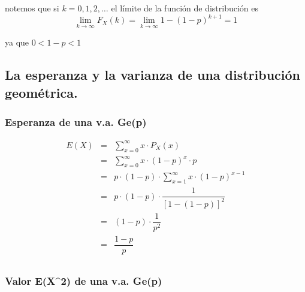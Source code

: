 \documentclass[
]{article}
\begin{document}
notemos que si \(k=0,1,2,\ldots\) el límite de la función de
distribución es
\[\lim_{k\to \infty} F_X(k) = \lim_{k\to \infty} 1 - (1-p)^{k+1} = 1\]

ya que \(0<1-p<1\)

\hypertarget{la-esperanza-y-la-varianza-de-una-distribuciuxf3n-geomuxe9trica.}{%
\subsection{La esperanza y la varianza de una distribución
geométrica.}\label{la-esperanza-y-la-varianza-de-una-distribuciuxf3n-geomuxe9trica.}}

\hypertarget{esperanza-de-una-v.a.-gep}{%
\subsubsection{Esperanza de una v.a.
Ge(p)}\label{esperanza-de-una-v.a.-gep}}

\[\begin{array}{rcl}
  E(X) &=& \sum\limits_{x=0}^\infty x \cdot P_X(x)\\
  &=& \sum\limits_{x=0}^\infty x\cdot (1-p)^x \cdot p\\\
  &=& p\cdot (1-p)\cdot \sum\limits_{x=1}^\infty x\cdot (1-p)^{x-1}\\
  &=& p\cdot (1-p)\cdot \dfrac{1}{\left[1-(1-p)\right]^2}\\
  &=&(1-p)\cdot \dfrac{1}{p^2}\\
  &=&\dfrac{1-p}{p}\\
\end{array}\]

\hypertarget{valor-ex2-de-una-v.a.-gep}{%
\subsubsection{Valor E(X\^{}2) de una v.a.
Ge(p)}\label{valor-ex2-de-una-v.a.-gep}}
\end{document}
